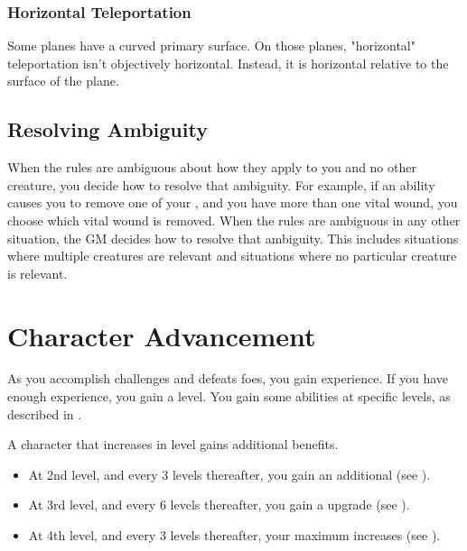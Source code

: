         \subsubsection{Horizontal Teleportation}
            Some planes have a curved primary surface.
            On those planes, "horizontal" teleportation isn't objectively horizontal.
            Instead, it is horizontal relative to the surface of the plane.

    \subsection{Resolving Ambiguity}\label{Resolving Ambiguity}
        When the rules are ambiguous about how they apply to you and no other creature, you decide how to resolve that ambiguity.
        For example, if an ability causes you to remove one of your , and you have more than one vital wound, you choose which vital wound is removed.
        When the rules are ambiguous in any other situation, the GM decides how to resolve that ambiguity.
        This includes situations where multiple creatures are relevant and situations where no particular creature is relevant.

\section{Character Advancement}\label{Character Advancement}

    As you accomplish challenges and defeats foes, you gain experience.
    If you have enough experience, you gain a level.
    You gain some abilities at specific levels, as described in .

    A character that increases in level gains additional benefits.
    \begin{itemize}
        \item At 2nd level, and every 3 levels thereafter, you gain an additional  (see ).
        \item At 3rd level, and every 6 levels thereafter, you gain a  upgrade (see ).
        \item At 4th level, and every 3 levels thereafter, your maximum  increases (see ).
    \end{itemize}

